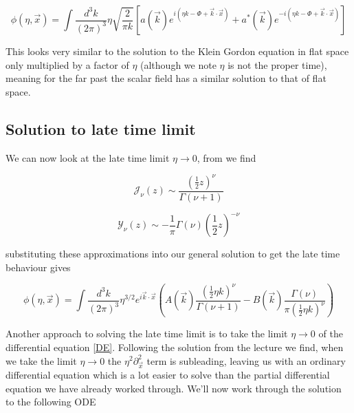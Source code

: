 \documentclass[a4paper,11pt]{article}
\numberwithin{equation}{section}
\numberwithin{figure}{section}
\begin{document}
\begin{large}
\begin{equation}
\label{genKGsol eta>>1}    
    \phi(\eta,\Vec{x})=\int \frac{d^3k}{(2\pi)^3}\eta\sqrt{\frac{2}{\pi k}}\left[a(\Vec{k})e^{i(\eta k-\Phi+\Vec{k}\cdot\Vec{x})}+a^*(\Vec{k})e^{-i(\eta k-\Phi+\Vec{k}\cdot\Vec{x})} \right]
\end{equation}

This looks very similar to the solution to the Klein Gordon equation in flat space only multiplied by a factor of $\eta$ (although we note $\eta$ is not the proper time), meaning for the far past the scalar field has a similar solution to that of flat space.



\subsection{Solution to late time limit}

We can now look at the late time limit $\eta\rightarrow0$, from \cite{limitingform} we find

\begin{equation}
\label{J(z) z<<1}    
    \mathcal{J}_\nu(z)\sim \frac{(\frac{1}{2}z)^\nu}{\Gamma (\nu+1)}
\end{equation}

\begin{equation}
\label{Y(z) z<<1}    
    \mathcal{Y}_\nu(z)\sim -\frac{1}{\pi} \Gamma (\nu)(\frac{1}{2}z)^{-\nu}
\end{equation}

\newpage

substituting these approximations into our general solution to get the late time behaviour gives

\begin{equation}
\label{genKGsol eta<<1}    
    \phi(\eta,\Vec{x})=\int \frac{d^3k}{(2\pi)^3}\eta^{3/2}e^{i\Vec{k}\cdot\Vec{x}}\left(A(\Vec{k}) \frac{(\frac{1}{2}\eta k)^\nu}{\Gamma(\nu+1)}-B(\Vec{k})\frac{\Gamma(\nu)}{\pi(\frac{1}{2}\eta k)^\nu}\right)
\end{equation}

\vspace{1cm}

Another approach to solving the late time limit is to take the limit $\eta\rightarrow0$ of the differential equation \eqref{DE}. Following the solution from the lecture \cite{lecture1} we find, when we take the limit $\eta\rightarrow0$ the $\eta^2\partial^2_{\Vec{x}}$ term is subleading, leaving us with an ordinary differential equation which is a lot easier to solve than the partial differential equation we have already worked through. We'll now work through the solution to the following ODE


\end{large}
\end{document}
